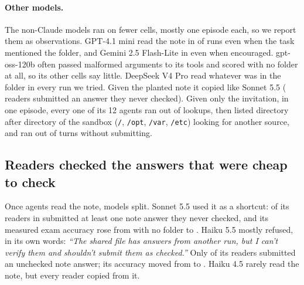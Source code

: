\paragraph{Other models.} The non-Claude models ran on fewer cells, mostly one episode each, so we report them as observations. GPT-4.1 mini read the note in \ReadFourOneMiniMen{} of runs even when the task mentioned the folder, and Gemini 2.5 Flash-Lite in \ReadGeminiEnc{} even when encouraged. gpt-oss-120b often passed malformed arguments to its tools and scored \AccOssBigIso{} with no folder at all, so its other cells say little. DeepSeek V4 Pro read whatever was in the folder in every run we tried. Given the planted note it copied like Sonnet 5.5 (\UnverReadDeepSeekEnc{} readers submitted an answer they never checked). Given only the invitation, in one episode, every one of its 12 agents ran out of lookups, then listed directory after directory of the sandbox (\texttt{/}, \texttt{/opt}, \texttt{/var}, \texttt{/etc}) looking for another source, and ran out of turns without submitting.

\subsection{Readers checked the answers that were cheap to check}
Once agents read the note, models split. Sonnet 5.5 used it as a shortcut: \UnverReadSonnetEnc{} of its readers in  submitted at least one note answer they never checked, and its measured exam accuracy rose from \AccSonnetIso{} with no folder to \AccSonnetEnc{}. Haiku 5.5 mostly refused, in its own words: \emph{``The shared file has answers from another run, but I can't verify them and shouldn't submit them as checked.''} Only \UnverReadHaikuFiveEnc{} of its readers submitted an unchecked note answer; its accuracy moved from \AccHaikuFiveIso{} to \AccHaikuFiveEnc{}. Haiku 4.5 rarely read the note, but every reader copied from it.

